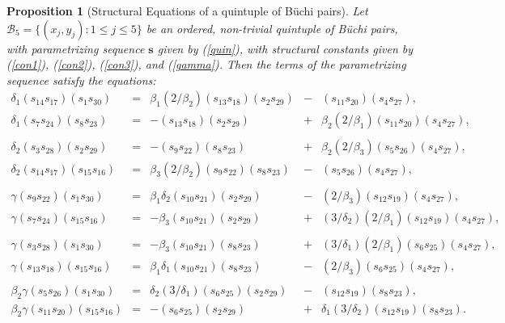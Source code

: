 \documentclass[letterpaper,10pt]{amsart}
\newcommand{\Bs}{{\mathbf{s}}}
\newcommand{\B}{{\mathcal{B}}}
\newtheorem{proposition}[theorem]{Proposition}
\theoremstyle{definition}
\numberwithin{equation}{section}
\begin{document}
\begin{proposition}[Structural Equations of a quintuple of B\"{u}chi pairs]  \label{quinstruc}
Let $\B_5 = \{(x_j, y_j) : 1 \leq j \leq 5\}$ be an ordered, non-trivial quintuple of B\"{u}chi pairs, with parametrizing sequence $\Bs$ given by (\ref{quin}), with structural constants given by (\ref{con1}), (\ref{con2}), (\ref{con3}), and (\ref{gamma}). Then the terms of the parametrizing sequence satisfy the equations: 
\begin{equation} \label{pfaffquin} 
\begin{matrix} \delta_1  (s_{14} s_{17})(s_1 s_{30}) &= &  \beta_1 (2/\beta_2)(s_{13} s_{18})(s_2 s_{29}) & - & (s_{11} s_{20})(s_4 s_{27})   , \\
\delta_1 (s_7 s_{24})(s_8 s_{23}) & = & - (s_{13} s_{18}) (s_2 s_{29}) & + & \beta_2(2/\beta_1)(s_{11} s_{20})(s_4 s_{27}), \\ \\
\delta_2 (s_3 s_{28})(s_2 s_{29}) & = & -(s_9 s_{22})(s_8 s_{23}) & + & \beta_2 (2/\beta_3) (s_5 s_{26})(s_4 s_{27}), \\
\delta_2 (s_{14} s_{17})(s_{15} s_{16}) & = & \beta_3 (2/\beta_2) (s_9 s_{22})(s_8 s_{23}) & - & (s_5 s_{26})(s_4 s_{27}), \\ \\
\gamma (s_9 s_{22})(s_1 s_{30}) & = &  \beta_1 \delta_2 (s_{10} s_{21}) (s_2 s_{29}) & - & (2/\beta_3) (s_{12} s_{19})(s_4 s_{27}), \\
\gamma (s_7 s_{24})(s_{15} s_{16}) & = & -\beta_3 (s_{10} s_{21})(s_2 s_{29}) & + & (3/\delta_2)(2/\beta_1) (s_{12} s_{19})(s_4 s_{27}), \\ \\
 \gamma (s_3 s_{28})(s_1 s_{30}) & = & - \beta_3 (s_{10} s_{21})(s_8 s_{23}) & + & (3/\delta_1)(2/\beta_1) (s_6 s_{25})(s_4 s_{27}), \\
 \gamma (s_{13} s_{18})(s_{15} s_{16}) & = & \beta_1 \delta_1 (s_{10} s_{21})(s_8 s_{23}) & - & (2/\beta_3) (s_6 s_{25})(s_4 s_{27}), \\ \\
\beta_2 \gamma (s_5 s_{26})(s_1 s_{30}) & = &  \delta_2 (3/\delta_1) (s_6 s_{25})(s_2 s_{29}) & - & (s_{12} s_{19})(s_8 s_{23}), \\ 
\beta_2 \gamma (s_{11} s_{20})(s_{15} s_{16}) & = & -(s_6 s_{25})(s_2 s_{29}) & + & \delta_1 (3/\delta_2) (s_{12} s_{19})(s_8 s_{23}). 
\end{matrix} 
\end{equation}
\end{proposition} 
\end{document}
